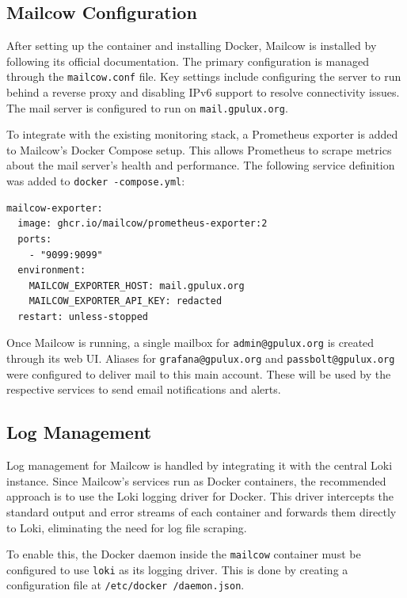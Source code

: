 \subsection*{Mailcow Configuration}

After setting up the container and installing Docker, Mailcow is installed by following its official documentation\cite{mailcow-install}. The primary configuration is managed through the \texttt{mailcow.conf} file. Key settings include configuring the server to run behind a reverse proxy\cite{mailcow-reverse-proxy} and disabling IPv6 support to resolve connectivity issues\cite{mailcow-disable-ipv6}. The mail server is configured to run on \texttt{mail.gpulux.org}.

To integrate with the existing monitoring stack, a Prometheus exporter is added to Mailcow's Docker Compose setup. This allows Prometheus to scrape metrics about the mail server's health and performance. The following service definition was added to \texttt{docker -compose.yml}\cite{mailcow-prometheus-exporter}:

\begin{lstlisting}[caption={Docker Compose service for the Mailcow Prometheus exporter.}]
mailcow-exporter:
  image: ghcr.io/mailcow/prometheus-exporter:2
  ports:
    - "9099:9099"
  environment:
    MAILCOW_EXPORTER_HOST: mail.gpulux.org
    MAILCOW_EXPORTER_API_KEY: redacted
  restart: unless-stopped
\end{lstlisting}

Once Mailcow is running, a single mailbox for \texttt{admin@gpulux.org} is created through its web UI. Aliases for \texttt{grafana@gpulux.org} and \texttt{passbolt@gpulux.org} were configured to deliver mail to this main account. These will be used by the respective services to send email notifications and alerts.

\subsection*{Log Management}

Log management for Mailcow is handled by integrating it with the central Loki instance. Since Mailcow's services run as Docker containers, the recommended approach is to use the Loki logging driver for Docker\cite{loki-docker-driver}. This driver intercepts the standard output and error streams of each container and forwards them directly to Loki, eliminating the need for log file scraping.

To enable this, the Docker daemon inside the \texttt{mailcow} container must be configured to use \texttt{loki} as its logging driver. This is done by creating a configuration file at \texttt{/etc/docker /daemon.json}\cite{loki-docker-driver-config}.


